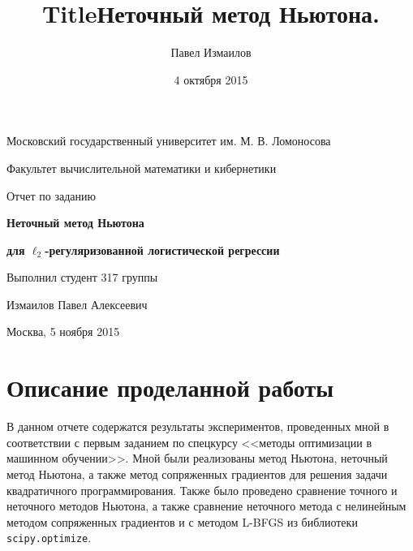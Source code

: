 \documentclass[12pt]{article}
\title{Title}
\title{Неточный метод Ньютона.}
\date{4 октября 2015}
\author{Павел Измаилов}
\begin{document}
\renewcommand{\contentsname}{\centerline{\bf Содержание}} %

\renewcommand{\refname}{\centerline{\bf Список литературы}}

\newlength{\arrayrulewidthOriginal}
\newcommand{\Cline}[2]{%
  \noalign{\global\setlength{\arrayrulewidthOriginal}{\arrayrulewidth}}%
  \noalign{\global\setlength{\arrayrulewidth}{#1}}\cline{#2}%
  \noalign{\global\setlength{\arrayrulewidth}{\arrayrulewidthOriginal}}}


\def\vec#1{\mathchoice{\mbox{\boldmath$\displaystyle#1$}}
{\mbox{\boldmath$\textstyle#1$}} {\mbox{\boldmath$\scriptstyle#1$}} {\mbox{\boldmath$\scriptscriptstyle#1$}}}

\centerline{Московский государственный университет им. М. В. Ломоносова}

\centerline{Факультет вычислительной математики и кибернетики}

\vspace{5 cm}

\centerline{\Large Отчет по заданию}

\vspace{1 cm}

\centerline{\Large \bf Неточный метод Ньютона}
\centerline{\Large \bf для $\ell_2$-регуляризованной логистической регрессии}

\vspace{6 cm}

\begin{flushright} 
Выполнил студент 317 группы

Измаилов Павел Алексеевич
\end{flushright}

\vfill 

\centerline{Москва,  5 ноября 2015}
\thispagestyle{empty} 
\pagebreak

\section{Описание проделанной работы}

\hspace{0.6cm}В данном отчете содержатся результаты экспериментов, проведенных мной в соответствии с первым заданием по спецкурсу <<методы оптимизации в машинном обучении>>. Мной были реализованы метод Ньютона, неточный метод Ньютона, а также метод сопряженных градиентов для решения задачи квадратичного программирования. Также было проведено сравнение точного и неточного методов Ньютона, а также сравнение неточного метода с нелинейным методом сопряженных градиентов и с методом L-BFGS из библиотеки \lstinline{scipy.optimize}.
\end{document}

